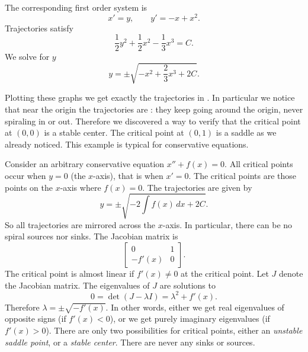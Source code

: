 \begin{exampleSol}  
The corresponding
first order system is
\begin{equation*}
x' = y , \qquad y' = -x+x^2 .
\end{equation*}
Trajectories satisfy
\begin{equation*}
\frac{1}{2} y^2  + \frac{1}{2} x^2 - \frac{1}{3} x^3  = C .
\end{equation*}
We solve for $y$
\begin{equation*}
y = \pm \sqrt{-x^2 + \frac{2}{3} x^3  + 2C} .
\end{equation*}

Plotting these graphs we get exactly the trajectories in 
.  In particular we notice that near the origin
the trajectories are \emph{}: they keep going
around the origin, never spiraling in or out.  Therefore we discovered a way
to verify that the critical point at $(0,0)$ is a stable center.
The critical point at $(0,1)$ is a saddle as we already noticed.
This example is typical for conservative equations.
\end{exampleSol}

Consider an arbitrary
conservative equation $x'' + f(x) = 0$.
All critical points occur when $y=0$ (the
$x$-axis), that is when $x' = 0$.  The critical points are 
those points on the $x$-axis where $f(x) = 0$.
The trajectories are given by
\begin{equation*}
y = \pm \sqrt{ - 2 \int f(x)\, dx + 2C} .
\end{equation*}
So all trajectories are mirrored across the $x$-axis.  In particular,
there can be no spiral sources nor sinks.
The Jacobian matrix is
\begin{equation*}
\begin{bmatrix}
0 & 1 \\
-f'(x) & 0
\end{bmatrix} .
\end{equation*}
The critical point is almost linear if $f'(x) \not= 0$ at the critical 
point.  Let $J$ denote the Jacobian matrix.
The eigenvalues of $J$ are solutions to
\begin{equation*}
0 = \det(J - \lambda I) = \lambda^2 + f'(x) .
\end{equation*}
Therefore $\lambda = \pm \sqrt{-f'(x)}$.  In other words, either we get
real eigenvalues of opposite signs (if $f'(x) < 0$),
or we get purely imaginary eigenvalues (if $f'(x) > 0$).
There are only two possibilities for critical points, either an \emph{unstable
saddle point}, or a \emph{stable center}.
There are never any sinks or sources.

